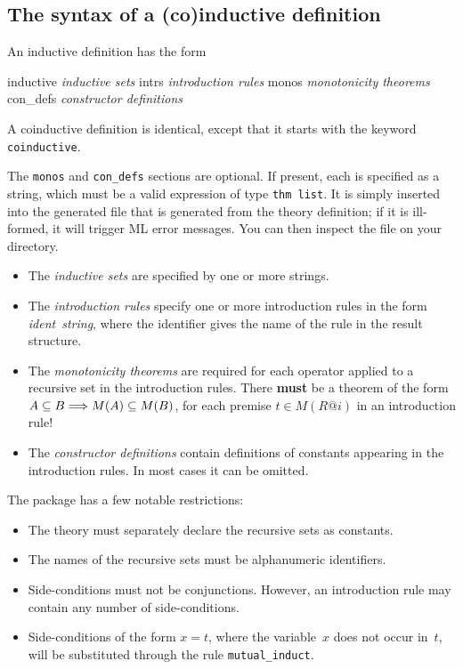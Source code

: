 \subsection{The syntax of a (co)inductive definition}
An inductive definition has the form
\begin{ttbox}
inductive    \textit{inductive sets}
  intrs      \textit{introduction rules}
  monos      \textit{monotonicity theorems}
  con_defs   \textit{constructor definitions}
\end{ttbox}
A coinductive definition is identical, except that it starts with the keyword
{\tt coinductive}.  

The \texttt{monos} and \texttt{con_defs} sections are optional.  If present,
each is specified as a string, which must be a valid \ML{} expression
of type \texttt{thm list}.  It is simply inserted into the generated
\ML{} file that is generated from the theory definition; if it is
ill-formed, it will trigger ML error messages.  You can then inspect
the file on your directory.

\begin{itemize}
\item The \textit{inductive sets} are specified by one or more strings.

\item The \textit{introduction rules} specify one or more introduction rules in
  the form \textit{ident\/}~\textit{string}, where the identifier gives the name of
  the rule in the result structure.

\item The \textit{monotonicity theorems} are required for each operator
  applied to a recursive set in the introduction rules.  There {\bf must}
  be a theorem of the form $A\subseteq B\Longrightarrow M(A)\subseteq M(B)$, for each
  premise $t\in M(R@i)$ in an introduction rule!

\item The \textit{constructor definitions} contain definitions of constants
  appearing in the introduction rules.  In most cases it can be omitted.
\end{itemize}

The package has a few notable restrictions:
\begin{itemize}
\item The theory must separately declare the recursive sets as
  constants.
  
\item The names of the recursive sets must be alphanumeric
  identifiers.

\item Side-conditions must not be conjunctions.  However, an introduction rule
may contain any number of side-conditions.

\item Side-conditions of the form $x=t$, where the variable~$x$ does not
  occur in~$t$, will be substituted through the rule \verb|mutual_induct|.
\end{itemize}


